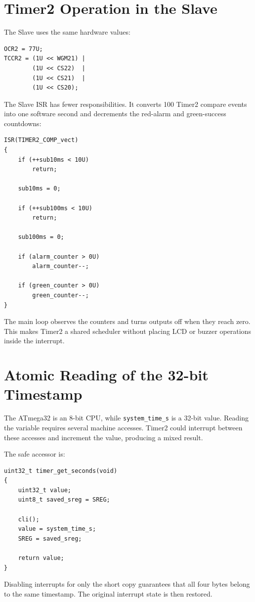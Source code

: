 \documentclass[11pt,a4paper]{article}
\begin{document}
\section{Timer2 Operation in the Slave}
The Slave uses the same hardware values:
\begin{lstlisting}[style=cstyle]
OCR2 = 77U;
TCCR2 = (1U << WGM21) |
        (1U << CS22)  |
        (1U << CS21)  |
        (1U << CS20);
\end{lstlisting}

The Slave ISR has fewer responsibilities. It converts 100 Timer2 compare events into one software second and decrements the red-alarm and green-success countdowns:
\begin{lstlisting}[style=cstyle,caption={Simplified Slave Timer2 ISR.}]
ISR(TIMER2_COMP_vect)
{
    if (++sub10ms < 10U)
        return;

    sub10ms = 0;

    if (++sub100ms < 10U)
        return;

    sub100ms = 0;

    if (alarm_counter > 0U)
        alarm_counter--;

    if (green_counter > 0U)
        green_counter--;
}
\end{lstlisting}

The main loop observes the counters and turns outputs off when they reach zero. This makes Timer2 a shared scheduler without placing LCD or buzzer operations inside the interrupt.

\section{Atomic Reading of the 32-bit Timestamp}
The ATmega32 is an 8-bit CPU, while \texttt{system\_time\_s} is a 32-bit value. Reading the variable requires several machine accesses. Timer2 could interrupt between these accesses and increment the value, producing a mixed result.

The safe accessor is:
\begin{lstlisting}[style=cstyle]
uint32_t timer_get_seconds(void)
{
    uint32_t value;
    uint8_t saved_sreg = SREG;

    cli();
    value = system_time_s;
    SREG = saved_sreg;

    return value;
}
\end{lstlisting}

Disabling interrupts for only the short copy guarantees that all four bytes belong to the same timestamp. The original interrupt state is then restored.
\end{document}
